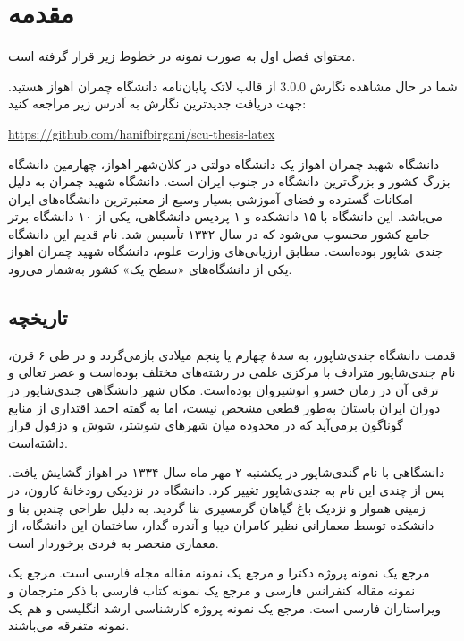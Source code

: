 
\chapter{مقدمه} \label{chapter:introduction}

محتوای فصل اول به صورت نمونه در خطوط زیر قرار گرفته است.

شما در حال مشاهده نگارش $3.0.0$ از قالب لاتک پایان‌نامه دانشگاه چمران اهواز هستید. جهت دریافت جدیدترین نگارش به آدرس زیر مراجعه کنید:

\begin{center}
	\href{https://github.com/hanifbirgani/scu-thesis-latex}{https://github.com/hanifbirgani/scu-thesis-latex}
\end{center}



دانشگاه شهید چمران اهواز یک دانشگاه دولتی در کلان‌شهر اهواز، چهارمین دانشگاه بزرگ کشور و بزرگ‌ترین دانشگاه در جنوب ایران است. دانشگاه شهید چمران به دلیل امکانات گسترده و فضای آموزشی بسیار وسیع از معتبرترین دانشگاه‌های ایران می‌باشد. این دانشگاه با ۱۵ دانشکده و ۱ پردیس دانشگاهی، یکی از ۱۰ دانشگاه برتر جامع کشور محسوب می‌شود که در سال ۱۳۳۲ تأسیس شد. نام قدیم این دانشگاه جندی شاپور بوده‌است. مطابق ارزیابی‌های وزارت علوم، دانشگاه شهید چمران اهواز یکی از دانشگاه‌های «سطح یک» کشور به‌شمار می‌رود.
\section{تاریخچه}\label{sec:history}

قدمت دانشگاه جندی‌شاپور، به سدهٔ چهارم یا پنجم میلادی بازمی‌گردد و در طی ۶ قرن، نام جندی‌شاپور مترادف با مرکزی علمی در رشته‌های مختلف بوده‌است و عصر تعالی و ترقی آن در زمان خسرو انوشیروان بوده‌است. مکان شهر دانشگاهی جندی‌شاپور در دوران ایران باستان به‌طور قطعی مشخص نیست، اما به گفته احمد اقتداری از منابع گوناگون برمی‌آید که در محدوده میان شهرهای شوشتر، شوش و دزفول قرار داشته‌است.\cite{eghtedari00diyar}

دانشگاهی با نام گندی‌شاپور در یکشنبه ۲ مهر ماه سال ۱۳۳۴ در اهواز گشایش یافت. پس از چندی این نام به جندی‌شاپور تغییر کرد. دانشگاه در نزدیکی رودخانهٔ کارون، در زمینی هموار و نزدیک باغ گیاهان گرمسیری بنا گردید. به دلیل طراحی چندین بنا و دانشکده توسط معمارانی نظیر کامران دیبا و آندره گدار، ساختمان این دانشگاه، از معماری منحصر به فردی برخوردار است.

مرجع \cite{Omidali82phdThesis} یک نمونه پروژه دکترا و مرجع \cite{Vahedi87} یک نمونه مقاله مجله فارسی است.
مرجع \cite{Amintoosi87afzayesh}  یک نمونه  مقاله کنفرانس فارسی و
مرجع \cite{Pedram80osool} یک نمونه کتاب فارسی با ذکر مترجمان و ویراستاران فارسی است. مرجع \cite{Khalighi07MscThesis} یک نمونه پروژه کارشناسی ارشد انگلیسی و
\cite{Khalighi87xepersian} هم یک نمونه متفرقه  می‌باشند.

